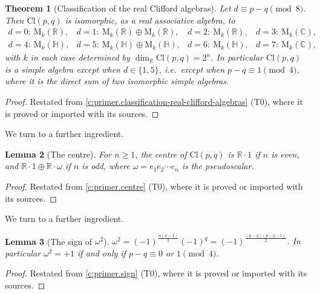 \documentclass[11pt]{article}
\newtheorem{theorem}{Theorem}[section]
\newtheorem{lemma}[theorem]{Lemma}
\theoremstyle{definition}
\theoremstyle{plain}
\newcommand{\changedmark}[2]{\marginpar{\raggedright\scriptsize\color{#1}#2}}
\providecommand{\C}{}\renewcommand{\C}{\mathbb{C}}
\providecommand{\Cl}{}\renewcommand{\Cl}{\mathrm{Cl}}
\providecommand{\HH}{}\renewcommand{\HH}{\mathbb{H}}
\providecommand{\Mat}{}\renewcommand{\Mat}{\mathrm{M}}
\providecommand{\R}{}\renewcommand{\R}{\mathbb{R}}
\begin{document}
\begin{theorem}[Classification of the real Clifford algebras]\label{c:transport.classification-real-clifford-algebras}
\changedmark{gray}{reworded}
Let $d \equiv p - q \pmod 8$. Then $\Cl(p,q)$ is isomorphic, as a real associative algebra, to
\[
\begin{array}{llll}
d = 0:\ \Mat_{k}(\R), &
d = 1:\ \Mat_{k}(\R) \oplus \Mat_{k}(\R), &
d = 2:\ \Mat_{k}(\R), &
d = 3:\ \Mat_{k}(\C), \\[2pt]
d = 4:\ \Mat_{k}(\HH), &
d = 5:\ \Mat_{k}(\HH) \oplus \Mat_{k}(\HH), &
d = 6:\ \Mat_{k}(\HH), &
d = 7:\ \Mat_{k}(\C),
\end{array}
\]
with $k$ in each case determined by $\dim_\R \Cl(p,q) = 2^n$. In particular $\Cl(p,q)$ is a simple algebra except when $d \in \{1, 5\}$, i.e.\ except when $p - q \equiv 1 \pmod 4$, where it is the direct sum of two isomorphic simple algebras.
\end{theorem}
\begin{proof}
Restated from \ref{c:primer.classification-real-clifford-algebras} (T0), where it is proved or imported with its sources.

\end{proof}

We turn to a further ingredient.

\begin{lemma}[The centre]\label{c:transport.centre}
\changedmark{gray}{reworded}
For $n \geq 1$, the centre of $\Cl(p,q)$ is $\R \cdot 1$ if $n$ is even, and $\R \cdot 1 \oplus \R \cdot \omega$ if $n$ is odd, where $\omega = e_1 e_2 \cdots e_n$ is the pseudoscalar.
\end{lemma}
\begin{proof}
Restated from \ref{c:primer.centre} (T0), where it is proved or imported with its sources.

\end{proof}

We turn to a further ingredient.

\begin{lemma}[The sign of $\omega^2$]\label{c:transport.sign}
\changedmark{gray}{reworded}
$\displaystyle \omega^2 = (-1)^{\tfrac{n(n-1)}{2}} (-1)^q = (-1)^{\tfrac{(p-q)(p-q-1)}{2}}$. In particular $\omega^2 = +1$ if and only if $p - q \equiv 0$ or $1 \pmod 4$.
\end{lemma}
\begin{proof}
Restated from \ref{c:primer.sign} (T0), where it is proved or imported with its sources.

\end{proof}
\end{document}

